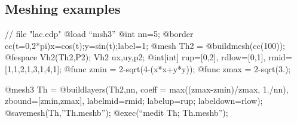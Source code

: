 \documentclass[a4paper,twoside,12pt]{book}
\begin{document}
\subsection{Meshing examples}


\begin{example}
// file "lac.edp"
\bFF
@load ``msh3''
@int nn=5;
@border cc(t=0,2*pi){x=cos(t);y=sin(t);label=1;}
@mesh Th2 = @buildmesh(cc(100));
@fespace Vh2(Th2,P2);
Vh2 ux,uy,p2;
@int[int] rup=[0,2], rdlow=[0,1], rmid=[1,1,2,1,3,1,4,1];
@func zmin = 2-sqrt(4-(x*x+y*y));
@func zmax = 2-sqrt(3.);

@mesh3 Th = @buildlayers(Th2,nn,
  coeff = max((zmax-zmin)/zmax, 1./nn),
  zbound=[zmin,zmax],
  labelmid=rmid;
  labelup=rup;
  labeldown=rlow);
@savemesh(Th,''Th.meshb'');
@exec(``medit Th; Th.meshb'');
\eFF
\end{example}
\end{document}
